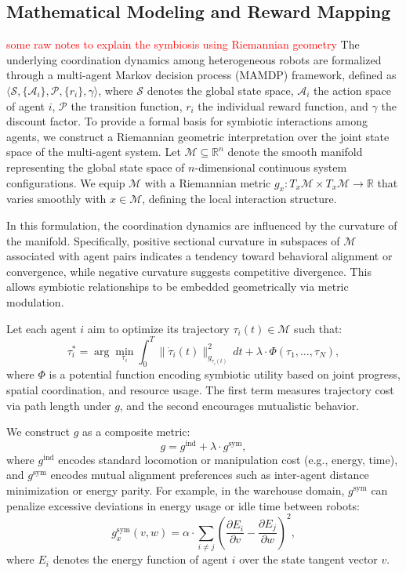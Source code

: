 \subsection{Mathematical Modeling and Reward Mapping}
\textcolor{red}{some raw notes to explain the symbiosis using Riemannian geometry}
The underlying coordination dynamics among heterogeneous robots are formalized through a multi-agent Markov decision process (MAMDP) framework, defined as $\langle \mathcal{S}, \{\mathcal{A}_i\}, \mathcal{P}, \{r_i\}, \gamma \rangle$, where $\mathcal{S}$ denotes the global state space, $\mathcal{A}_i$ the action space of agent $i$, $\mathcal{P}$ the transition function, $r_i$ the individual reward function, and $\gamma$ the discount factor. To provide a formal basis for symbiotic interactions among agents, we construct a Riemannian geometric interpretation over the joint state space of the multi-agent system. Let $\mathcal{M} \subseteq \mathbb{R}^n$ denote the smooth manifold representing the global state space of $n$-dimensional continuous system configurations. We equip $\mathcal{M}$ with a Riemannian metric $g_x: T_x\mathcal{M} \times T_x\mathcal{M} \rightarrow \mathbb{R}$ that varies smoothly with $x \in \mathcal{M}$, defining the local interaction structure.

In this formulation, the coordination dynamics are influenced by the curvature of the manifold. Specifically, positive sectional curvature in subspaces of $\mathcal{M}$ associated with agent pairs indicates a tendency toward behavioral alignment or convergence, while negative curvature suggests competitive divergence. This allows symbiotic relationships to be embedded geometrically via metric modulation.

Let each agent $i$ aim to optimize its trajectory $\tau_i(t) \in \mathcal{M}$ such that:
\[
\tau_i^* = \arg \min_{\tau_i} \int_0^T \| \dot{\tau}_i(t) \|_{g_{\tau_i(t)}}^2 \, dt + \lambda \cdot \Phi(\tau_1, \dots, \tau_N),
\]
where $\Phi$ is a potential function encoding symbiotic utility based on joint progress, spatial coordination, and resource usage. The first term measures trajectory cost via path length under $g$, and the second encourages mutualistic behavior.

We construct $g$ as a composite metric:
\[
g = g^{\text{ind}} + \lambda \cdot g^{\text{sym}},
\]
where $g^{\text{ind}}$ encodes standard locomotion or manipulation cost (e.g., energy, time), and $g^{\text{sym}}$ encodes mutual alignment preferences such as inter-agent distance minimization or energy parity. For example, in the warehouse domain, $g^{\text{sym}}$ can penalize excessive deviations in energy usage or idle time between robots:
\[
g^{\text{sym}}_{x}(v, w) = \alpha \cdot \sum_{i \neq j} \left( \frac{\partial E_i}{\partial v} - \frac{\partial E_j}{\partial w} \right)^2,
\]
where $E_i$ denotes the energy function of agent $i$ over the state tangent vector $v$.

